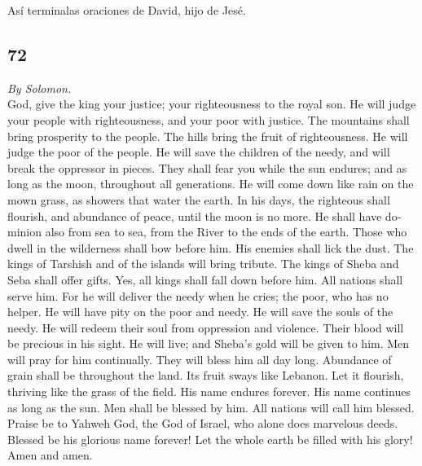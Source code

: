 \begin{paracol}{2}
 Así terminalas oraciones de David, hijo de Jesé.

\switchcolumn
\begin{otherlanguage}{english}

\hypertarget{section-143}{%
\section{72}\label{section-143}}

\emph{By Solomon.}\\
 God, give the king your justice; your righteousness to
the royal son.  He will judge your people with
righteousness, and your poor with justice.  The mountains
shall bring prosperity to the people. The hills bring the fruit of
righteousness.  He will judge the poor of the people. He
will save the children of the needy, and will break the oppressor in
pieces.  They shall fear you while the sun endures; and as
long as the moon, throughout all generations.  He will
come down like rain on the mown grass, as showers that water the earth.
 In his days, the righteous shall flourish, and abundance
of peace, until the moon is no more.  He shall have
dominion also from sea to sea, from the River to the ends of the earth.
 Those who dwell in the wilderness shall bow before him.
His enemies shall lick the dust.  The kings of Tarshish
and of the islands will bring tribute. The kings of Sheba and Seba shall
offer gifts.  Yes, all kings shall fall down before him.
All nations shall serve him.  For he will deliver the
needy when he cries; the poor, who has no helper.  He
will have pity on the poor and needy. He will save the souls of the
needy.  He will redeem their soul from oppression and
violence. Their blood will be precious in his sight.  He
will live; and Sheba's gold will be given to him. Men will pray for him
continually. They will bless him all day long.  Abundance
of grain shall be throughout the land. Its fruit sways like Lebanon. Let
it flourish, thriving like the grass of the field.  His
name endures forever. His name continues as long as the sun. Men shall
be blessed by him. All nations will call him blessed. 
Praise be to Yahweh God, the God of Israel, who alone does marvelous
deeds.  Blessed be his glorious name forever! Let the
whole earth be filled with his glory! Amen and amen.


\end{otherlanguage}
\end{paracol}
